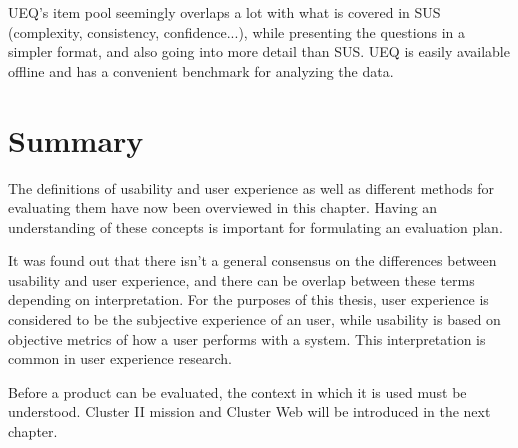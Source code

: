 UEQ's item pool seemingly overlaps a lot with what is covered in SUS (complexity, consistency, confidence...), while presenting the questions in a simpler format, and also going into more detail than SUS. UEQ is easily available offline and has a convenient benchmark for analyzing the data.

\section{Summary}
The definitions of usability and user experience as well as different methods for evaluating them have now been overviewed in this chapter. Having an understanding of these concepts is important for formulating an evaluation plan. 

It was found out that there isn't a general consensus on the differences between usability and user experience, and there can be overlap between these terms depending on interpretation. For the purposes of this thesis, user experience is considered to be the subjective experience of an user, while usability is based on objective metrics of how a user performs with a system. This interpretation is common in user experience research.

Before a product can be evaluated, the context in which it is used must be understood. Cluster II mission and Cluster Web will be introduced in the next chapter.
